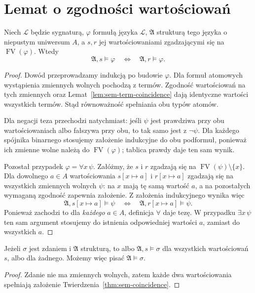 \section{Lemat o zgodności wartościowań}
\begin{twierdzenie}
\label{thm:sem-coincidence}
Niech $\mathcal L$ będzie sygnaturą, $\varphi$ formułą
języka $\mathcal L$, $\mathfrak A$ strukturą tego języka
o niepustym uniwersum $A$, a $s,r$ jej wartościowaniami
zgadzającymi się na
$\operatorname{FV}(\varphi)$. Wtedy
\[
\mathfrak A,s\models\varphi
\quad\Longleftrightarrow\quad
\mathfrak A,r\models\varphi.
\]
\end{twierdzenie}
\begin{proof}
Dowód przeprowadzamy indukcją po budowie $\varphi$.
Dla formuł atomowych wystąpienia zmiennych wolnych pochodzą
z termów. Zgodność wartościowań na tych zmiennych oraz
Lemat~\ref{lem:sem-term-coincidence} dają identyczne wartości
wszystkich termów. Stąd równoważność spełniania obu typów atomów.

Dla negacji teza przechodzi natychmiast: jeśli $\psi$ jest
prawdziwa przy obu wartościowaniach albo fałszywa przy obu,
to tak samo jest z $\neg\psi$. Dla każdego spójnika binarnego
stosujemy założenie indukcyjne do obu podformuł, ponieważ
ich zmienne wolne należą do $\operatorname{FV}(\varphi)$;
tablica prawdy daje ten sam wynik.

Pozostał przypadek $\varphi=\forall x\,\psi$.
Załóżmy, że $s$ i $r$ zgadzają się na
$\operatorname{FV}(\psi)\setminus\{x\}$.
Dla dowolnego $a\in A$ wartościowania
$s[x\mapsto a]$ i $r[x\mapsto a]$ zgadzają się na
wszystkich zmiennych wolnych $\psi$: na $x$ mają tę samą
wartość $a$, a na pozostałych wymaganą zgodność zapewnia założenie.
Z założenia indukcyjnego wynika więc
\[
\mathfrak A,s[x\mapsto a]\models\psi
\quad\Longleftrightarrow\quad
\mathfrak A,r[x\mapsto a]\models\psi.
\]
Ponieważ zachodzi to dla \emph{każdego} $a\in A$,
definicja $\forall$ daje tezę. W przypadku
$\exists x\,\psi$ ten sam argument stosujemy do istnienia
odpowiedniej wartości $a$, zamiast do wszystkich $a$.
\end{proof}

\begin{wniosek}
\label{cor:sem-sentence}
Jeżeli $\sigma$ jest zdaniem i $\mathfrak A$ strukturą,
to albo $\mathfrak A,s\models\sigma$ dla wszystkich wartościowań $s$,
albo dla żadnego. Możemy więc pisać $\mathfrak A\models\sigma$.
\end{wniosek}
\begin{proof}
Zdanie nie ma zmiennych wolnych, zatem każde dwa wartościowania
spełniają założenie Twierdzenia~\ref{thm:sem-coincidence}.
\end{proof}


